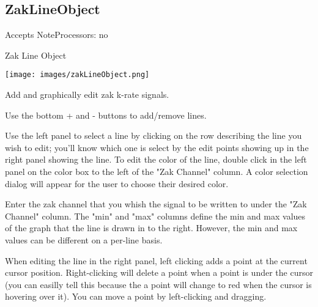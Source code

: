 \subsection{ZakLineObject}\label{zakLineObject}

Accepts NoteProcessors: no

Zak Line Object

\texttt{[image: images/zakLineObject.png]}

Add and graphically edit zak k-rate signals.

Use the bottom + and - buttons to add/remove lines.

Use the left panel to select a line by clicking on the row describing
the line you wish to edit; you'll know which one is select by the edit
points showing up in the right panel showing the line. To edit the color
of the line, double click in the left panel on the color box to the left
of the "Zak Channel" column. A color selection dialog will appear for
the user to choose their desired color.

Enter the zak channel that you whish the signal to be written to under
the "Zak Channel" column. The "min" and "max" columns define the min and
max values of the graph that the line is drawn in to the right. However,
the min and max values can be different on a per-line basis.

When editing the line in the right panel, left clicking adds a point at
the current cursor position. Right-clicking will delete a point when a
point is under the cursor (you can easilly tell this because the a point
will change to red when the cursor is hovering over it). You can move a
point by left-clicking and dragging.

